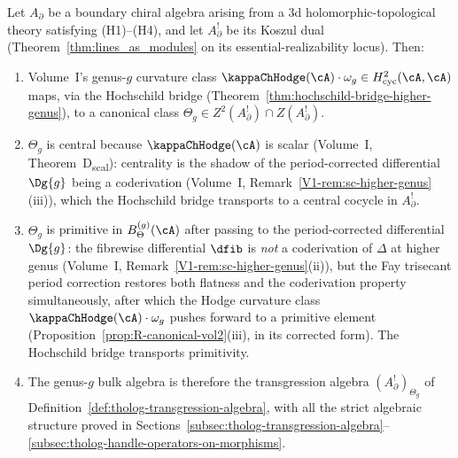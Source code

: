 \begin{conjecture}
Let \(A_{\partial}\) be a boundary chiral algebra arising from a 3d
holomorphic-topological theory satisfying \textrm{(H1)--(H4)}, and
let \(A_{\partial}^{!}\) be its Koszul dual
(Theorem~\textup{\ref{thm:lines_as_modules}} on its
essential-realizability locus).
Then:
\begin{enumerate}[label=\textup{(\roman*)}]
\item Volume~I's genus-\(g\) curvature class
 \(\kappaChHodge(\cA) \cdot \omega_g \in H^2_{\mathrm{cyc}}(\cA,\cA)\)
 maps, via the Hochschild bridge
 (Theorem~\textup{\ref{thm:hochschild-bridge-higher-genus}}),
 to a canonical class
 \(\Theta_g \in Z^2(A_{\partial}^{!}) \cap Z(A_{\partial}^{!})\).
\item \(\Theta_g\) is central because \(\kappaChHodge(\cA)\) is scalar
 (Volume~I, Theorem~D\textsubscript{scal}): centrality is the
 shadow of the period-corrected differential
 \(\Dg{g}\) being a coderivation
 (Volume~I, Remark~\ref{V1-rem:sc-higher-genus}\textup{(iii)}),
 which the Hochschild bridge transports to a central cocycle
 in \(A_\partial^!\).
\item \(\Theta_g\) is primitive in \(B_\Theta^{(g)}(\cA)\)
 after passing to the period-corrected differential
 \(\Dg{g}\): the fibrewise differential \(\dfib\) is
 \emph{not} a coderivation of \(\Delta\) at higher genus
 (Volume~I, Remark~\ref{V1-rem:sc-higher-genus}\textup{(ii)}),
 but the Fay trisecant period correction restores both
 flatness and the coderivation property simultaneously, after
 which the Hodge curvature class
 \(\kappaChHodge(\cA)\cdot\omega_g\) pushes forward to a primitive
 element (Proposition~\textup{\ref{prop:R-canonical-vol2}(iii)},
 in its corrected form).
 The Hochschild bridge transports primitivity.
\item The genus-\(g\) bulk algebra is therefore the transgression
 algebra \((A_{\partial}^{!})_{\Theta_g}\) of
 Definition~\textup{\ref{def:tholog-transgression-algebra}}, with
 all the strict algebraic structure proved in
 Sections~\textup{\ref{subsec:tholog-transgression-algebra}--\ref{subsec:tholog-handle-operators-on-morphisms}}.
\end{enumerate}
\end{conjecture}

